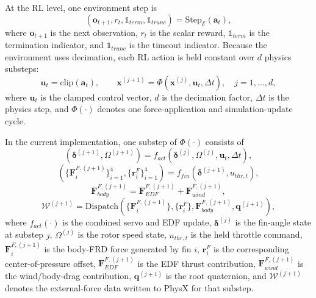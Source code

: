 \documentclass[10pt,twocolumn]{article}
\begin{document}
At the RL level, one environment step is
\begin{equation}
\left(
\mathbf{o}_{t+1},
r_t,
\mathbb{1}_{term},
\mathbb{1}_{trunc}
\right)
=
\mathrm{Step}_{\mathcal{E}}(\mathbf{a}_t),
\label{eq:isaac_step}
\end{equation}
where $\mathbf{o}_{t+1}$ is the next observation, $r_t$ is the scalar reward, $\mathbb{1}_{term}$ is the termination indicator, and $\mathbb{1}_{trunc}$ is the timeout indicator. Because the environment uses decimation, each RL action is held constant over $d$ physics substeps:
\begin{equation}
\mathbf{u}_t = \mathrm{clip}(\mathbf{a}_t),
\qquad
\mathbf{x}^{(j+1)} = \Phi\!\left(\mathbf{x}^{(j)},\mathbf{u}_t,\Delta t\right),
\quad j=1,\ldots,d,
\label{eq:decimated_rollout}
\end{equation}
where $\mathbf{u}_t$ is the clamped control vector, $d$ is the decimation factor, $\Delta t$ is the physics step, and $\Phi(\cdot)$ denotes one force-application and simulation-update cycle.

In the current implementation, one substep of $\Phi(\cdot)$ consists of
\begin{equation}
\left(\boldsymbol{\delta}^{(j+1)},\Omega^{(j+1)}\right)
=
f_{act}\!\left(
\boldsymbol{\delta}^{(j)},
\Omega^{(j)},
\mathbf{u}_t,
\Delta t
\right),
\label{eq:substep_actuation}
\end{equation}
\begin{equation}
\left(\{\mathbf{F}_{i}^{F,(j+1)}\}_{i=1}^{4},\{\mathbf{r}_{i}^{F}\}_{i=1}^{4}\right)
=
f_{fin}\!\left(
\boldsymbol{\delta}^{(j+1)},
u_{thr,t}
\right),
\label{eq:substep_finforces}
\end{equation}
\begin{equation}
\mathbf{F}_{body}^{F,(j+1)}
=
\mathbf{F}_{EDF}^{F,(j+1)}
+
\mathbf{F}_{wind}^{F,(j+1)},
\label{eq:body_force_combined}
\end{equation}
\begin{equation}
\mathcal{W}^{(j+1)}
=
\mathrm{Dispatch}\!\left(
\{\mathbf{F}_{i}^{F,(j+1)}\},
\{\mathbf{r}_{i}^{F}\},
\mathbf{F}_{body}^{F,(j+1)},
\mathbf{q}^{(j+1)}
\right),
\label{eq:wrench_dispatch_step}
\end{equation}
where $f_{act}(\cdot)$ is the combined servo and EDF update, $\boldsymbol{\delta}^{(j)}$ is the fin-angle state at substep $j$, $\Omega^{(j)}$ is the rotor speed state, $u_{thr,t}$ is the held throttle command, $\mathbf{F}_{i}^{F,(j+1)}$ is the body-FRD force generated by fin $i$, $\mathbf{r}_{i}^{F}$ is the corresponding center-of-pressure offset, $\mathbf{F}_{EDF}^{F,(j+1)}$ is the EDF thrust contribution, $\mathbf{F}_{wind}^{F,(j+1)}$ is the wind/body-drag contribution, $\mathbf{q}^{(j+1)}$ is the root quaternion, and $\mathcal{W}^{(j+1)}$ denotes the external-force data written to PhysX for that substep.
\end{document}
